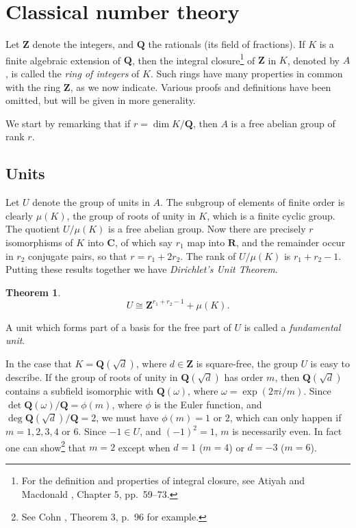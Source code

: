 \documentclass[10pt,leqno]{article}
\newtheorem{theo}{Theorem}[subsection]
\theoremstyle{definition}
\def\ZZ{\mathbf{Z}}
\def\QQ{\mathbf{Q}}
\def\RR{\mathbf{R}}
\def\CC{\mathbf{C}}
\def\fnonth{For the definition and properties of integral closure, see Atiyah and Macdonald \cite{bib:17}, Chapter 5, pp.~59--73.}
\def\fnonfo{See Cohn \cite{bib:36}, Theorem 3, p.~96 for example.}
\begin{document}
\section{Classical number theory}
\label{ch:2}

Let $\ZZ$ denote the integers, and $\QQ$ the rationals (its field of fractions).
If $K$ is a finite algebraic extension of $\QQ$, then the integral closure\footnote{\fnonth} of $\ZZ$ in $K$, denoted by $A$, is called the \emph{ring of integers} of $K$.
Such rings have many properties in common with the ring $\ZZ$, as we now indicate.
Various proofs and definitions have been omitted, but will be given in more generality.

We start by remarking that if $r = \dim K/\QQ$, then $A$ is a free abelian group of rank $r$.


\subsection{Units}
\label{ch:2.1}

Let $U$ denote the group of units in $A$.
The subgroup of elements of finite order is clearly $\mu(K)$, the group of roots of unity in $K$, which is a finite cyclic group.
The quotient $U / \mu(K)$ is a free abelian group.
Now there are precisely $r$ isomorphisms of $K$ into $\CC$, of which say $r_1$ map into $\RR$, and the remainder occur in $r_2$ conjugate pairs, so that $r = r_1 + 2 r_2$.
The rank of $U / \mu(K)$ is $r_1 + r_2 - 1$.
Putting these results together we have \emph{Dirichlet's Unit Theorem}.


\begin{theo}
\label{2.1.1}
\[
U \cong \ZZ^{r_1 + r_2 - 1} + \mu(K).
\]
\end{theo}

A unit which forms part of a basis for the free part of $U$ is called a \emph{fundamental unit}.

In the case that $K = \QQ(\sqrt d)$, where $d \in \ZZ$ is square-free, the group $U$ is easy to describe.
If the group of roots of unity in $\QQ(\sqrt d)$ has order $m$, then $\QQ(\sqrt d)$ contains a subfield isomorphic with $\QQ(\omega)$, where $\omega = \exp(2 \pi i / m)$.
Since $\det \QQ(\omega) / \QQ = \phi(m)$, where $\phi$ is the Euler function, and $\deg \QQ(\sqrt d) / \QQ = 2$, we must have $\phi(m) = 1$ or $2$, which can only happen if $m = 1,2,3,4$ or $6$.
Since $-1 \in U$, and $(-1)^2 = 1$, $m$ is necessarily even.
In fact one can show\footnote{\fnonfo} that $m = 2$ except when $d = 1$ ($m = 4$) or $d = -3$ ($m = 6$).
\end{document}
